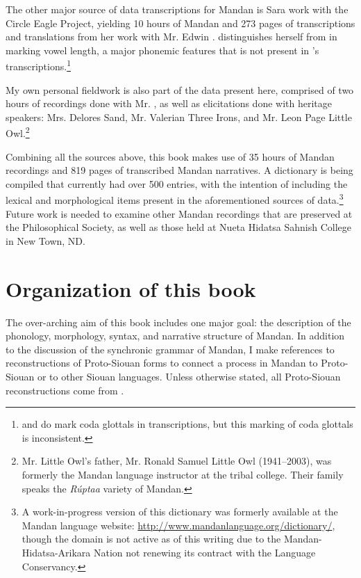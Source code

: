 The other major source of data transcriptions for Mandan is Sara  work with the Circle Eagle Project, yielding 10 hours of Mandan and 273 pages of transcriptions and translations from her work with Mr. Edwin \citet{benson2000}. \citeauthor{trechter2012} distinguishes herself from \citeauthor{hollow1970} in marking vowel length, a major phonemic features that is not present in \citeauthor{hollow1970}'s transcriptions.\footnote{\citet{hollow1970,hollow1973a,hollow1973b} and \citet{hollow1976} do mark coda glottals in transcriptions, but this marking of coda glottals is inconsistent.} 

My own personal fieldwork is also part of the data present here, comprised of two hours of recordings done with Mr. \citeauthor{benson2000}, as well as elicitations done with heritage speakers: Mrs. Delores Sand, Mr. Valerian Three Irons, and Mr. Leon Page Little Owl.\footnote{Mr. Little Owl's father, Mr. Ronald Samuel Little Owl (1941--2003), was formerly the Mandan language instructor at the tribal college. Their family speaks the \textit{Rúptaa} variety of Mandan.}

Combining all the sources above, this book makes use of 35 hours of Mandan recordings and 819 pages of transcribed Mandan narratives. A dictionary is being compiled that currently had over 500 entries, with the intention of including the lexical and morphological items present in the aforementioned sources of data.\footnote{A work-in-progress version of this dictionary was formerly available at the Mandan language website: \href{http://www.mandanlanguage.org/dictionary/}{http://www.mandanlanguage.org/dictionary/}, though the domain is not active as of this writing due to the Mandan-Hidatsa-Arikara Nation not renewing its contract with the Language Conservancy.} Future work is needed to examine other Mandan recordings that are preserved at the Philosophical Society, as well as those held at Nueta Hidatsa Sahnish College in New Town, ND.


\section{Organization of this book}\label{organization}

The over-arching aim of this book includes one major goal: the description of the phonology, morphology, syntax, and narrative structure of Mandan. In addition to the discussion of the synchronic grammar of Mandan, I make references to reconstructions of Proto-Siouan forms to connect a process in Mandan to Proto-Siouan or to other Siouan languages. Unless otherwise stated, all Proto-Siouan reconstructions come from \citet{rankin2015}.

